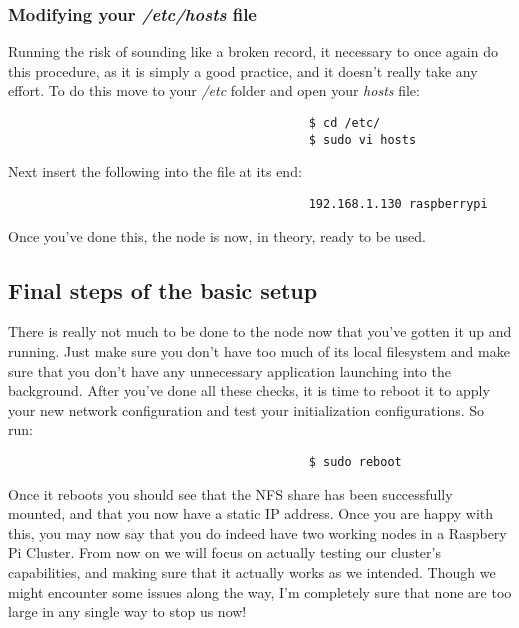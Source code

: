 \documentclass[]{article}
\begin{document}
                                          \subsubsection{Modifying your \textit{/etc/hosts} file}
                                          Running the risk of sounding like a broken record, it necessary to once again do this procedure, as it is simply a good practice, and
                                          it doesn't really take any effort. To do this move to your \textit{/etc} folder and open your \textit{hosts} file:
                                          \begin{lstlisting}
                                          $ cd /etc/
                                          $ sudo vi hosts
                                          \end{lstlisting}
                                          Next insert the following into the file at its end:
                                          \begin{lstlisting}
                                          192.168.1.130 raspberrypi
                                          \end{lstlisting}
                                          Once you've done this, the node is now, in theory, ready to be used.

                                          \subsection{Final steps of the basic setup}
                                          There is really not much to be done to the node now that you've gotten it up and running. Just make sure you don't have too much of its 
                                          local filesystem and make sure that you don't have any unnecessary application launching into the background. After you've done all 
                                          these checks, it is time to reboot it to apply your new network configuration and test your initialization configurations. So run:
                                          \begin{lstlisting}
                                          $ sudo reboot
                                          \end{lstlisting}
                                          Once it reboots you should see that the NFS share has been successfully mounted, and that you now have a static IP address. Once you 
                                          are happy with this, you may now say that you do indeed have two working nodes in a Raspbery Pi Cluster. From now on we will focus on 
                                          actually testing our cluster's capabilities, and making sure that it actually works as we intended. Though we might encounter some 
                                          issues along the way, I'm completely sure that none are too large in any single way to stop us now!
\end{document}
